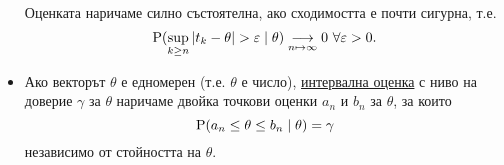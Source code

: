 \documentclass[numbers=endperiod, DIV=15, bibliography=totocnumbered]{scrartcl}
\begin{document}
\begin{definition}[Оценки]
\begin{itemize}
    Оценката наричаме силно състоятелна, ако сходимостта е почти сигурна, т.е.
    \begin{displaymath}
      \operatorname{P}(\sup_{k \geq n} \left\vert t_k - \theta \right\vert > \varepsilon \mid \theta) \underset {n \mapsto \infty} \longrightarrow 0~\forall \varepsilon > 0.
    \end{displaymath}

    \item Ако векторът $\theta$ е едномерен (т.е. $\theta$ е число), \uline{интервална оценка} с ниво на доверие $\gamma$ за $\theta$ наричаме двойка точкови оценки $a_n$ и $b_n$ за $\theta$, за които
    \begin{displaymath}
      \operatorname{P}(a_n \leq \theta \leq b_n \mid \theta) = \gamma
    \end{displaymath}
    независимо от стойността на $\theta$.
  \end{itemize}
\end{definition}

\printbibliography
\end{document}
